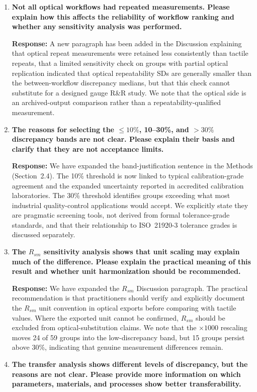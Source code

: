 \documentclass[10pt]{article}
\begin{document}
\begin{enumerate}[leftmargin=*, label=\textbf{Comment \arabic*.}, ref=\arabic*]
\item \textbf{Not all optical workflows had repeated measurements. Please explain how this affects the reliability of workflow ranking and whether any sensitivity analysis was performed.}

\textbf{Response:} A new paragraph has been added in the Discussion explaining that optical repeat measurements were retained less consistently than tactile repeats, that a limited sensitivity check on groups with partial optical replication indicated that optical repeatability SDs are generally smaller than the between-workflow discrepancy medians, but that this check cannot substitute for a designed gauge R\&R study. We note that the optical side is an archived-output comparison rather than a repeatability-qualified measurement.

\item \textbf{The reasons for selecting the $\leq 10\%$, 10--30\%, and $>30\%$ discrepancy bands are not clear. Please explain their basis and clarify that they are not acceptance limits.}

\textbf{Response:} We have expanded the band-justification sentence in the Methods (Section~2.4). The 10\% threshold is now linked to typical calibration-grade agreement and the expanded uncertainty reported in accredited calibration laboratories. The 30\% threshold identifies groups exceeding what most industrial quality-control applications would accept. We explicitly state they are pragmatic screening tools, not derived from formal tolerance-grade standards, and that their relationship to ISO~21920-3 tolerance grades is discussed separately.

\item \textbf{The $R_{sm}$ sensitivity analysis shows that unit scaling may explain much of the difference. Please explain the practical meaning of this result and whether unit harmonization should be recommended.}

\textbf{Response:} We have expanded the $R_{sm}$ Discussion paragraph. The practical recommendation is that practitioners should verify and explicitly document the $R_{sm}$ unit convention in optical exports before comparing with tactile values. Where the exported unit cannot be confirmed, $R_{sm}$ should be excluded from optical-substitution claims. We note that the $\times 1000$ rescaling moves 24 of 59 groups into the low-discrepancy band, but 15 groups persist above 30\%, indicating that genuine measurement differences remain.

\item \textbf{The transfer analysis shows different levels of discrepancy, but the reasons are not clear. Please provide more information on which parameters, materials, and processes show better transferability.}


\end{enumerate}
\end{document}
